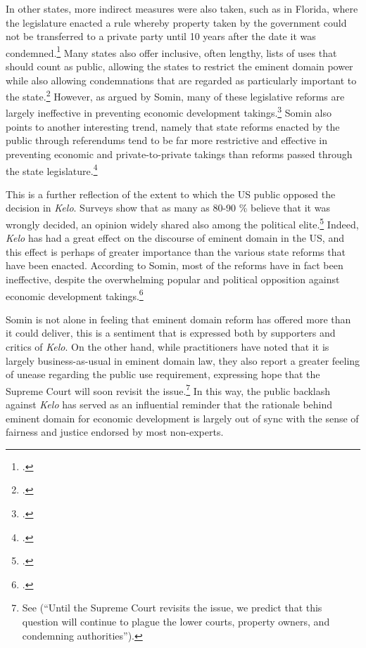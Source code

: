 \documentclass[12pt,a4paper]{book} %
\begin{document}
In other states, more indirect measures were also taken, such as in Florida, where the legislature enacted a rule whereby property taken by the government could not be transferred to a private party until 10 years after the date it was condemned.\footcite[809]{eagle08} Many states also offer inclusive, often lengthy, lists of uses that should count as public, allowing the states to restrict the eminent domain power while also allowing condemnations that are regarded as particularly important to the state.\footcite[804]{eagle08}
However, as argued by Somin, many of these legislative reforms are largely ineffective in preventing economic development takings.\footcite[2120]{somin09} Somin also points to another interesting trend, namely that state reforms enacted by the public through referendums tend to be far more restrictive and effective in preventing economic and private-to-private takings than reforms passed through the state legislature.\footcite[2143]{somin09} 

This is a further reflection of the extent to which the US public opposed the decision in {\it Kelo}. Surveys show that as many as 80-90 \% believe that it was wrongly decided, an opinion widely shared also among the political elite.\footcite[2109]{somin09} Indeed, {\it Kelo} has had a great effect on the discourse of eminent domain in the US, and this effect is perhaps of greater importance than the various state reforms that have been enacted. According to Somin, most of the reforms have in fact been ineffective, despite the overwhelming popular and political opposition against economic development takings.\footcite[2170-2171]{somin09} 

Somin is not alone in feeling that eminent domain reform has offered more than it could deliver, this is a sentiment that is expressed both by supporters and critics of {\it Kelo}. On the other hand, while practitioners have noted that it is largely business-as-usual in eminent domain law, they also report a greater feeling of unease regarding the public use requirement, expressing hope that the Supreme Court will soon revisit the issue.\footnote{See \cite{murakami13} (``Until the Supreme Court revisits the issue, we predict that this question will continue to plague the lower courts, property owners, and condemning authorities'').} In this way, the public backlash against {\it Kelo} has served as an influential reminder that the rationale behind eminent domain for economic development is largely out of sync with the sense of fairness and justice endorsed by most non-experts. 
\end{document}
